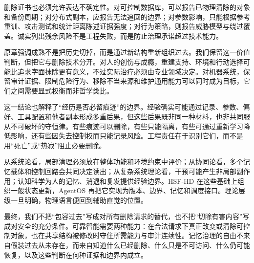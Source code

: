 删除证书也必须允许表达不确定性。对可控制数据库，可以报告已物理清除的对象和备份周期；对分布式副本，应报告无法追回的边界；对参数影响，只能根据参考重训、攻击测试和统计距离陈述证据强度；对行为策略，则报告威胁模型与绕过覆盖。诚实列出残余风险不是工程失败，而是防止治理承诺超过技术能力。

原章强调成熟不是把历史切掉，而是通过新结构重新组织过去。我们保留这一价值判断，但把它与删除技术分开。对人的创伤与成瘾，重建支持、环境和行动选择可能比追求字面抹除更有意义，不过实际治疗必须由专业领域决定。对机器系统，保留审计证据、限制危险行为、移除不当来源和维护通用能力可以同时成为目标，它们之间需要显式权衡而非哲学类比。

这一结论也解释了“经历是否必留痕迹”的边界。经验确实可能通过记录、参数、偏好、工具配置和他者副本形成多重后果，但这些后果既非同一种材料，也非共同服从不可破坏的守恒律。有些痕迹可以删除，有些只能隔离，有些可通过重新学习降低影响，还有些因失去控制权而只能记录风险。工程责任在于识别它们，而不是用“死亡”或“热寂”阻止必要删除。

从系统论看，局部清理必须放在整体功能和环境约束中评价；从协同论看，多个记忆载体和控制回路会共同决定读出；从复杂系统理论看，干预可能产生非局部副作用；认知科学为人的记忆、消退和复发提供经验边界。HSF-HD 在这些基础上组织一般状态更新，AgentOS 再把它实现为版本、边界、记忆和调度接口。理论层级一旦明确，物理语言便回到辅助直觉的位置。

最终，我们不把“包容过去”写成对所有删除请求的替代，也不把“切除有害内容”写成对安全的充分条件。可靠智能需要两种能力：在合法请求下真正改变或清除可控制对象，也在共享结构被修改时守住所需能力与审计连续性。记忆治理的自由不来自假装过去从未存在，而来自知道什么已经删除、什么只是不可访问、什么仍可能恢复，以及这些判断在何种证据和边界内成立。
